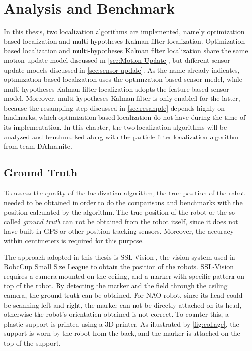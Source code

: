 \chapter{Analysis and Benchmark\label{cha:chapter6}}
In this thesis, two localization algorithms are implemented, namely optimization based localization and multi-hypotheses Kalman filter localization. Optimization based localization and multi-hypotheses Kalman filter localization share the same motion update model discussed in \autoref{sec:Motion Update}, but different sensor update models discussed in \autoref{sec:sensor update}.  As the name already indicates, optimization based localization uses the optimization based sensor model, while multi-hypotheses Kalman filter localization adopts the feature based sensor model. Moreover, multi-hypotheses Kalman filter is only enabled for the latter, because the resampling step discussed in \autoref{sec:resample} depends highly on landmarks, which optimization based localization do not have during the time of its implementation.
In this chapter, the two localization algorithms will be analyzed and benchmarked along with the particle filter localization algorithm from team DAInamite.

\section{Ground Truth}\label{sub:ground truth}
To assess the quality of the localization algorithm, the true position of the robot needed to be obtained in order to do the comparisons and benchmarks with the position calculated by the algorithm. The true position of the robot or the so called \textit{ground truth} can not be obtained from the robot itself, since it does not have built in \gls{GPS} or other position tracking sensors. Moreover, the accuracy within centimeters is required for this purpose. 

The approach adopted in this thesis is SSL-Vision \cite{zickler2010ssl}, the vision system used in RoboCup Small Size League to obtain the position of the robots. SSL-Vision requires a camera mounted on the ceiling, and a marker with specific pattern on top of the robot. By detecting the marker and the field through the ceiling camera, the ground truth can be obtained. For NAO robot, since its head could be scanning left and right, the marker can not be directly attached on its head, otherwise the robot's orientation obtained is not correct. To counter this, a plastic support is printed using a 3D printer. As illustrated by \autoref{fig:collage}, the support is worn by the robot from the back, and the marker is attached on the top of the support.

